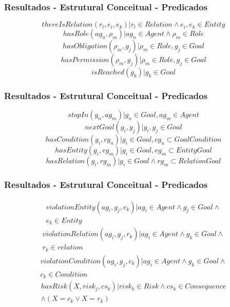 \documentclass{beamer}
\begin{document}
\begin{frame}
	\frametitle{Resultados - Estrutural Conceitual - Predicados}
	\begin{equation}
		thereIsRelation(r_l,e_i,e_k) | r_l \in Relation \wedge  e_i, e_k \in Entity
	\end{equation}
	\begin{equation}	
		hasRole(ag_n,\rho_m) | ag_n \in Agent \wedge \rho_m \in Role 	
	\end{equation}
	\begin{equation}	
		hasObligation(\rho_m,g_j) | \rho_m \in Role, g_j \in Goal 
	\end{equation}		
	\begin{equation}	
		hasPermission(\rho_m, g_j) | \rho_m \in Role, g_j \in Goal
	\end{equation}
	\begin{equation}		
		isReached(g_k) | g_k \in Goal 
	\end{equation}
\end{frame}
\begin{frame}
	\frametitle{Resultados - Estrutural Conceitual - Predicados}
	\begin{equation}			
		stopIn(g_n, ag_m) | g_n \in Goal, ag_m \in Agent
	\end{equation}
	\begin{equation}			
		nextGoal(g_i,g_j) |g_i, g_j \in Goal
	\end{equation}
	\begin{equation}				
		hasCondition(g_i,cg_n) | g_i \in Goal, cg_n \subset GoalCondition
	\end{equation}
	\begin{equation}				
		hasEntity(g_i,eg_m) | g_i \in Goal, eg_m \subset EntityGoal 
	\end{equation}
	\begin{equation}				
		hasRelation(g_i,rg_m) | g_i \in Goal \wedge rg_m \subset RelationGoal 
	\end{equation}
\end{frame}
\begin{frame}
	\frametitle{Resultados - Estrutural Conceitual - Predicados}
	\begin{eqnarray}
	    violationEntity(ag_i,g_j,e_k) |   ag_i \in Agent \wedge g_j \in Goal \wedge \\ \nonumber 
		e_k \in Entity  
	\end{eqnarray}
	\begin{eqnarray}
	    violationRelation(ag_i,g_j,r_k) | ag_i \in Agent \wedge g_k \in Goal \wedge \\ \nonumber 
		r_k \in relation 
	\end{eqnarray}
	\begin{eqnarray}
	    violationCondition(ag_i,g_j,c_k) | ag_i \in Agent \wedge g_k \in Goal \wedge \\ \nonumber 
		c_k \in Condition 
	\end{eqnarray}
	\begin{eqnarray}
	    hasRisk(X, risk_j, cs_k) | risk_k \in Risk \wedge cs_k \in Consequence  \\ \nonumber 
	 	\wedge (X = c_k \vee X = r_k)
	\end{eqnarray}
\end{frame}
\end{document}
